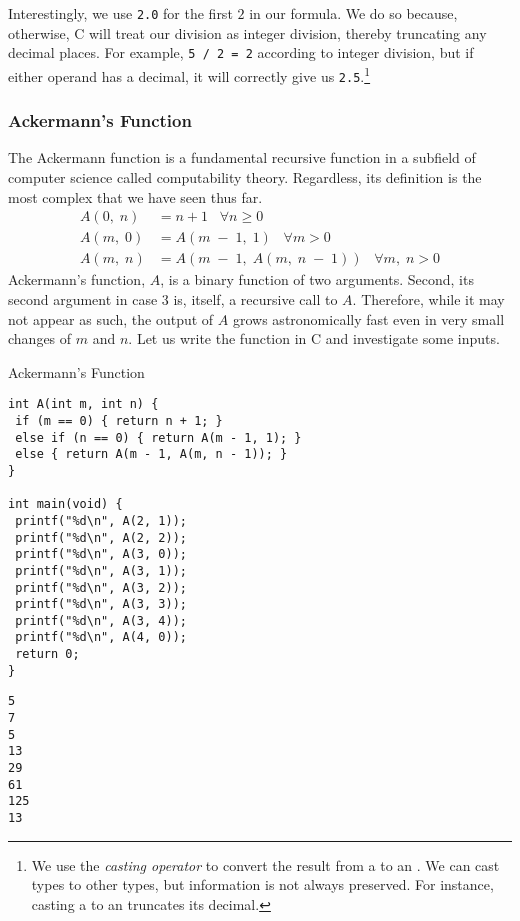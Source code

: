 Interestingly, we use \texttt{2.0} for the first $2$ in our formula. We do so because, otherwise, C will treat our division as integer division, thereby truncating any decimal places. For example, \texttt{5 / 2 = 2} according to integer division, but if either operand has a decimal, it will correctly give us \texttt{2.5}.\footnote{We use the \textit{casting operator}  to convert the result from a  to an . We can cast types to other types, but information is not always preserved. For instance, casting a  to an  truncates its decimal.}

\subsubsection*{Ackermann's Function}

The Ackermann function is a fundamental recursive function in a subfield of computer science called computability theory. Regardless, its definition is the most complex that we have seen thus far.
\begin{align*}
    A(0,\;n) &= n + 1 \;\;\; \forall {n \geq 0}\\
    A(m,\;0) &= A(m\;-\;1,\;1) \;\;\; \forall{}m > 0\\
    A(m,\;n) &= A(m\;-\;1,\;A(m,\;n\;-\;1)) \;\;\; \forall{m,\;n>0}
\end{align*}
Ackermann's function, $A$, is a binary function of two arguments. Second, its second argument in case 3 is, itself, a recursive call to $A$. Therefore, while it may not appear as such, the output of $A$ grows astronomically fast even in very small changes of $m$ and $n$. Let us write the function in C and investigate some inputs.

\begin{clo}[main.c]{Ackermann's Function}
\begin{lstlisting}[language=MyC]
int A(int m, int n) {
 if (m == 0) { return n + 1; }
 else if (n == 0) { return A(m - 1, 1); }
 else { return A(m - 1, A(m, n - 1)); }
} 

int main(void) {
 printf("%d\n", A(2, 1));
 printf("%d\n", A(2, 2));
 printf("%d\n", A(3, 0));
 printf("%d\n", A(3, 1));
 printf("%d\n", A(3, 2));
 printf("%d\n", A(3, 3));
 printf("%d\n", A(3, 4));
 printf("%d\n", A(4, 0));
 return 0;
}
\end{lstlisting}
\tcblower
\begin{lstlisting}[language=MyOutput]
5
7
5
13
29
61
125
13
\end{lstlisting}
\end{clo}

